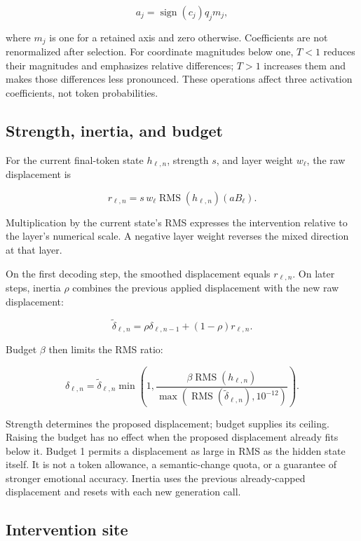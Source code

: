 \documentclass[manuscript,screen,nonacm]{acmart}
\begin{document}
\[
a_j=\operatorname{sign}(c_j)q_jm_j,
\]

where \(m_j\) is one for a retained axis and zero otherwise.
Coefficients are not renormalized after selection. For coordinate
magnitudes below one, \(T<1\) reduces their magnitudes and emphasizes
relative differences; \(T>1\) increases them and makes those differences
less pronounced. These operations affect three activation coefficients,
not token probabilities.

\subsection{Strength, inertia, and
budget}\label{strength-inertia-and-budget}

For the current final-token state \(h_{\ell,n}\), strength \(s\), and
layer weight \(w_\ell\), the raw displacement is

\[
r_{\ell,n}=s\,w_\ell\operatorname{RMS}(h_{\ell,n})(aB_\ell).
\]

Multiplication by the current state's RMS expresses the intervention
relative to the layer's numerical scale. A negative layer weight
reverses the mixed direction at that layer.

On the first decoding step, the smoothed displacement equals
\(r_{\ell,n}\). On later steps, inertia \(\rho\) combines the previous
applied displacement with the new raw displacement:

\[
\widetilde\delta_{\ell,n}=\rho\delta_{\ell,n-1}+(1-\rho)r_{\ell,n}.
\]

Budget \(\beta\) then limits the RMS ratio:

\[
\delta_{\ell,n}=\widetilde\delta_{\ell,n}
\min\left(1,
\frac{\beta\operatorname{RMS}(h_{\ell,n})}
{\max(\operatorname{RMS}(\widetilde\delta_{\ell,n}),10^{-12})}
\right).
\]

Strength determines the proposed displacement; budget supplies its
ceiling. Raising the budget has no effect when the proposed displacement
already fits below it. Budget 1 permits a displacement as large in RMS
as the hidden state itself. It is not a token allowance, a
semantic-change quota, or a guarantee of stronger emotional accuracy.
Inertia uses the previous already-capped displacement and resets with
each new generation call.

\subsection{Intervention site}\label{intervention-site}
\end{document}
